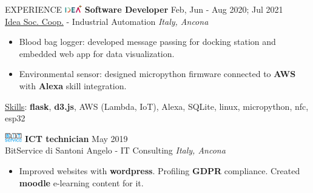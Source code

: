\documentclass{cv} %
\def\intraexpvspace{0.15cm}
\def\titlelistvspace{-0.15cm}
\begin{document}
\begin{rSection}{EXPERIENCE}
    \includegraphics[width=0.75cm, trim={0cm 1.5cm 0cm 0cm}]{idea-icon.png}
    \textbf{Software Developer} \hfill Feb, Jun - Aug 2020; Jul 2021\\
    \hspace*{0.85cm}\href{https://idea-on-line.it/}{Idea Soc. Coop.} - Industrial Automation \hfill \textit{Italy, Ancona}
    \vspace{\titlelistvspace}\begin{itemize}
        \itemsep -3pt {}
        \item Blood bag logger: developed message passing for docking station and embedded web app for data visualization.
        \item Environmental sensor: designed micropython firmware
              connected to \textbf{AWS}
              with \textbf{Alexa} skill integration.
    \end{itemize}
    \vspace*{-0.1cm}\hspace*{0.5cm}\underline{Skills}:
    \textbf{flask},
    \textbf{d3.js},
    AWS (Lambda, IoT),
    Alexa,
    SQLite,
    linux,
    micropython,
    nfc,
    esp32
    \vspace{\intraexpvspace}

    \includegraphics[width=0.75cm, trim={0cm 1.5cm 0cm 0cm}]{bitservice-icon.png}
    \textbf{ICT technician} \hfill May 2019 \\
    \hspace*{0.85cm}BitService di Santoni Angelo - IT Consulting \hfill \textit{Italy, Ancona}
    \vspace{\titlelistvspace}\begin{itemize}
        \itemsep -3pt {}
        \item Improved websites with \textbf{wordpress}.
              Profiling \textbf{GDPR} compliance.
              Created \textbf{moodle} e-learning content for it. %
    \end{itemize}

\end{rSection}
\end{document}
